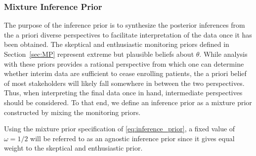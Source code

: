 \documentclass[useAMS,usenatbib,referee]{biom}
\begin{document}
%

%



\subsubsection{Mixture Inference Prior}
The purpose of the inference prior is to synthesize the posterior inferences from the a priori diverse perspectives to facilitate interpretation of the data once it has been obtained. The skeptical and enthusiastic monitoring priors defined in Section~\ref{sec:MP} represent extreme but plausible beliefs about $\theta$.
%
While analysis with these priors provides a rational perspective from which one can determine whether interim data are sufficient 
to cease enrolling patients, the a priori belief of most stakeholders will likely fall somewhere in between the two perspectives.
%
Thus, when interpreting the final data once in hand, intermediate perspectives should be considered.
%
To that end, we define an inference prior as a mixture prior constructed by mixing the monitoring priors.

Using the mixture prior specification of \eqref{eq:inference_prior}, a fixed value of $\omega=1/2$ will be referred to as an agnostic inference prior since it gives equal weight to the skeptical and enthusiastic prior.
%
\end{document}

